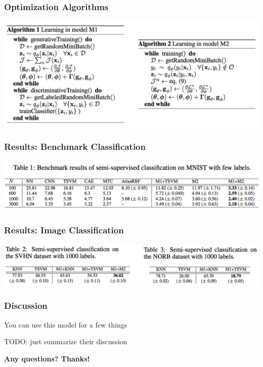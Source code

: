 \documentclass{beamer}
\begin{document}
\begin{frame}
  \frametitle{Optimization Algorithms}
  \includegraphics[scale=0.5]{learningModel}
\end{frame}

\begin{frame}
  \frametitle{Results: Benchmark Classification}

  \includegraphics[scale=0.5]{table1}
  
\end{frame}
\begin{frame}
  \frametitle{Results: Image Classification}

  \includegraphics[scale=0.5]{table2and3}
\end{frame}

\begin{frame}
  \frametitle{Discussion}

  You can use this model for a few things

  TODO: just summarize their discussion
\end{frame}

\begin{frame}
  \textbf{Any questions? Thanks!}
  \end{frame}


 
\end{document}
